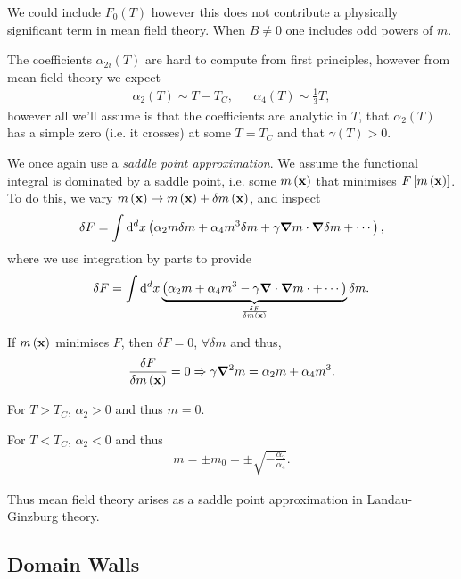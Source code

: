 We could include $F_0 \left( T \right) $ however this does not contribute a physically significant term in mean field theory. When $B \neq 0$ one includes odd powers of $m$.

The coefficients $\alpha_{2i} \left( T \right) $ are hard to compute from first principles, however from mean field theory we expect
\begin{align}
    \alpha_2 \left( T \right) \sim  T - T_C, && \alpha_4 \left( T \right) \sim  \frac{1}{3} T
,\end{align}
however all we'll assume is that the coefficients are analytic in $T$, that $\alpha_2 \left( T \right) $ has a simple zero (i.e. it crosses) at some $T = T_C$ and that $\gamma \left( T \right) > 0$.

We once again use a \textit{saddle point approximation}. We assume the functional integral is dominated by a saddle point, i.e. some $m \left( \vb{x} \right) $ that minimises $F \left[ m \left( \vb{x} \right)  \right] $. To do this, we vary $m \left( \vb{x} \right) \to m \left( \vb{x} \right) + \delta m \left( \vb{x} \right) $, and inspect
\begin{align}
    \delta F = \int \dd{^{d}x} \left( \alpha_2 m \delta m + \alpha_4 m^3 \delta m + \gamma \grad m \cdot \grad \delta m + \cdots \right) 
,\end{align}
where we use integration by parts to provide
\begin{align}
    \delta F = \int \dd{^{d}x} \underbrace{\left( \alpha_2 m  + \alpha_4 m^3 - \gamma \grad \cdot \grad m \cdot + \cdots \right)}_{\fdv{F}{m \left( \vb{x} \right) }} \delta m 
.\end{align}

If $m \left( \vb{x} \right) $ minimises $F$, then $\delta F = 0$, $\forall  \delta m $ and thus,
\begin{align}
    \fdv{F}{m \left( \vb{x} \right) } = 0 \implies \gamma \grad^2 m = \alpha_2 m + \alpha_4 m^3
.\end{align}

For $T > T_C$, $\alpha_2 > 0$ and thus $m = 0$.

For $T < T_C$, $\alpha_2 < 0$ and thus 
\begin{align}
    m = \pm m_0 = \pm \sqrt{-\frac{\alpha_2}{\alpha_4}} 
.\end{align}

Thus mean field theory arises as a saddle point approximation in Landau-Ginzburg theory.

\subsection{Domain Walls}

